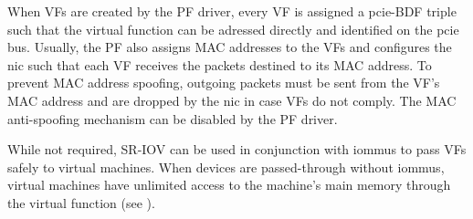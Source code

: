 When VFs are created by the PF driver, every VF is assigned a \ac{pcie}-BDF
triple such that the virtual function can be adressed directly and identified on
the \ac{pcie} bus. Usually, the PF also assigns MAC addresses to the VFs and
configures the \ac{nic} such that each VF receives the packets destined to its
MAC address. To prevent MAC address spoofing, outgoing packets must be sent from
the VF's MAC address and are dropped by the \ac{nic} in case VFs do not comply.
The MAC anti-spoofing mechanism can be disabled by the PF driver.

While not required, SR-IOV can be used in conjunction with \acp{iommu} to pass
VFs safely to virtual machines. When devices are passed-through without
\acp{iommu}, virtual machines have unlimited access to the machine's main memory
through the virtual function (see ).

